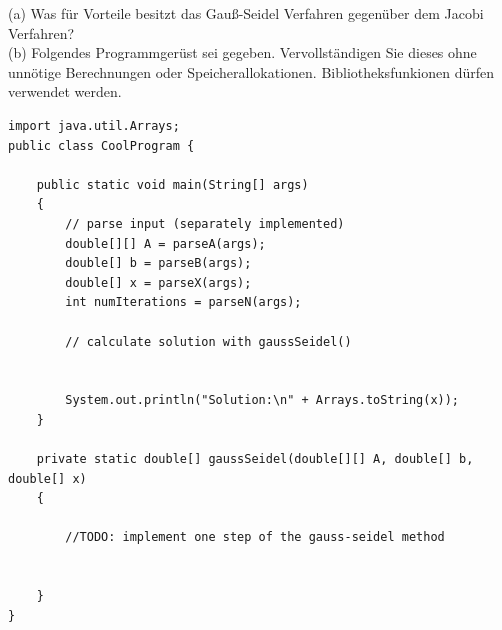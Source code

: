 \documentclass{scrartcl}
\begin{document}
(a) 
Was für Vorteile besitzt das Gauß-Seidel Verfahren gegenüber dem Jacobi Verfahren?
\lbreak \lbreak
\\
(b)
Folgendes Programmgerüst sei gegeben. Vervollständigen Sie dieses ohne unnötige Berechnungen oder Speicherallokationen. Bibliotheksfunkionen dürfen  verwendet werden.
\begin{lstlisting}
import java.util.Arrays;
public class CoolProgram {

	public static void main(String[] args) 
	{
		// parse input (separately implemented)
		double[][] A = parseA(args); 
		double[] b = parseB(args);
		double[] x = parseX(args);
		int numIterations = parseN(args);
		
		// calculate solution with gaussSeidel()
		
		
		System.out.println("Solution:\n" + Arrays.toString(x));
	}
	
	private static double[] gaussSeidel(double[][] A, double[] b, double[] x) 
	{
		
		//TODO: implement one step of the gauss-seidel method
	
	
	}
}
\end{lstlisting}
\end{document}
